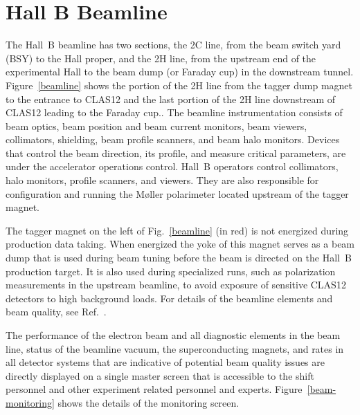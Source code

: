 \documentclass[final,3p,twocolumn]{elsarticle}
\begin{document}
\section{Hall B Beamline} 

The Hall~B beamline has two sections, the 2C line, from the beam switch yard (BSY) to the Hall proper, and the 2H
line, from the upstream end of the experimental Hall to the beam dump (or Faraday cup) in the downstream tunnel.
Figure~\ref{beamline} shows the portion of the 2H line from the tagger dump magnet to the entrance to CLAS12 and
the last portion of the 2H line downstream of CLAS12 leading to the Faraday cup.. The beamline instrumentation
consists of beam optics, beam position and beam current monitors, beam viewers, collimators,  shielding, beam
profile scanners, and beam halo monitors. Devices that control the beam direction, its profile, and  measure critical
parameters, are under the accelerator operations control. Hall~B operators control collimators, halo monitors,
profile scanners, and viewers. They are also responsible for configuration and running the M{\o}ller polarimeter
located upstream of the tagger magnet.

The tagger magnet on the left of Fig.~\ref{beamline} (in red) is not energized during production data taking. When energized the
yoke of this magnet serves as a beam dump that is used during beam tuning before the beam is directed on the
Hall~B production target. It is also used during specialized runs, such as polarization measurements in the upstream
beamline, to avoid exposure of sensitive CLAS12 detectors to high background loads. For details of the beamline
elements and beam quality, see Ref.~\cite{beamline}.  

The performance of the electron beam and all diagnostic elements in the beam line, status of the beamline vacuum, 
the superconducting magnets, and rates in all detector systems that are indicative of potential beam quality issues 
are directly displayed on a single master screen that is accessible to the shift personnel and other experiment related 
personnel and experts. Figure~\ref{beam-monitoring} shows the details of the monitoring screen.     
\end{document}
